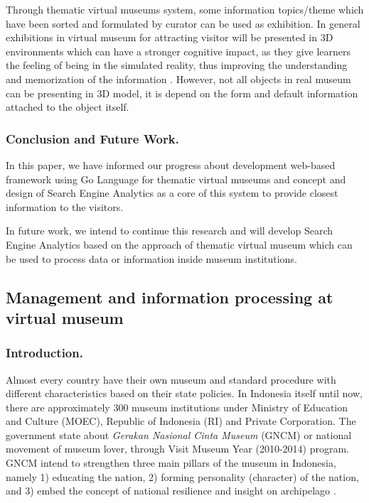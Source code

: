 Through thematic virtual museums system, some information topics/theme which have been sorted and formulated by curator can be used as exhibition. In general exhibitions in virtual museum for attracting visitor will be presented in 3D environments which can have a stronger cognitive impact, as they give learners the feeling of being in the simulated reality, thus improving the understanding and memorization of the information \cite{GheorghiuStefan}. However, not all objects in real museum can be presenting in 3D model, it is depend on the form and default information attached to the object itself.

\subsubsection{Conclusion and Future Work.} In this paper, we have informed our progress about development web-based framework using Go Language for thematic virtual museums and concept and design of Search Engine Analytics as a core of this system to provide closest information to the visitors.

In future work, we intend to continue this research and will develop Search Engine Analytics based on the approach of thematic virtual museum which can be used to process data or information inside museum institutions.

\subsection{Management and information processing at virtual museum}\label{subsec:ch4/sec2/sub4}

\subsubsection{Introduction.} Almost every country have their own museum and standard procedure with different characteristics based on their state policies. In Indonesia itself until now, there are approximately 300 museum institutions under Ministry of Education and Culture (MOEC), Republic of Indonesia (RI) and Private Corporation. The government state about \textit{Gerakan Nasional Cinta Museum} (GNCM) or national movement of museum lover, through Visit Museum Year (2010-2014) program. GNCM intend to strengthen three main pillars of the museum in Indonesia, namely 1) educating the nation, 2) forming personality (character) of the nation, and 3) embed the concept of national resilience and insight on archipelago \cite{MunandarPerdanaRahayu}.

